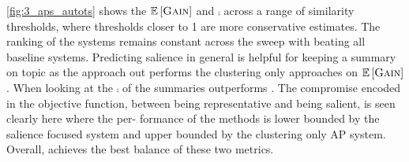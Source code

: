 \autoref{fig:3_aps_autots} shows the $\mathbb{E}\left[\textsc{Gain}\right]$ and $\comp$
across a range
of  similarity  thresholds,  where  thresholds  closer
to 1 are more conservative estimates. The ranking
of the systems remains constant across the sweep
with \sap{}
beating all baseline systems.
Predicting salience in general is helpful for keeping a summary on topic as 
the  \ranksal{}  approach out
performs  the  clustering  only  approaches  on  $\mathbb{E}\left[\textsc{Gain}\right]$.
When looking at the $\comp$ of the
summaries \ap{} outperforms \sap.  
The compromise  encoded  in  the  \sap{}
objective function, between being representative and
being salient, is seen clearly here where the per-
formance of the \sap{}
methods is lower
bounded by the salience focused  \ranksal{}  system and
upper bounded by the clustering only AP system.
Overall, \sap{}
achieves the best balance
of these two metrics.


